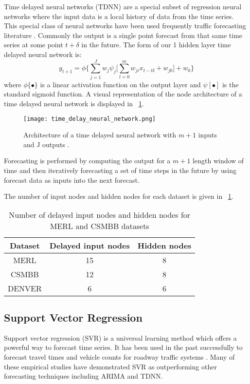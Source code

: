 Time delayed neural networks (TDNN) are a special subset of regression neural networks where the input data is a local history of data from the time series.  This special class of neural networks have been used frequently traffic forecasting literature \cite{Abdulhai1999, Ishak2003}.  Commonly the output is a single point forecast from that same time series at some point $t + \delta$ in the future.   The form of our 1 hidden layer time delayed neural network is:
\begin{equation}
y_{t + 1} = \phi \{ \sum_{j = 1}^{J} w_{j}\psi_{j} \bigg[ \sum_{l = 0}^{m}w_{ji}x_{t - l\delta} + w_{j0} \bigg] + w_0 \}
\end{equation}
\noindent where $\phi\{\bullet\}$ is a linear activation function on the output layer and $\psi[\bullet]$ is the standard sigmoid function.  A visual representation of the node architecture of a time delayed neural network is displayed in ~\ref{fig:tdnnarch}.

\begin{figure}[h]
	\centering
		\texttt{[image: time\_delay\_neural\_network.png]}
		\caption{Architecture of a time delayed neural network with $m + 1$ inputs and J outputs \cite{Hansen2003}.}
	\label{fig:tdnnarch}
\end{figure}

Forecasting is performed by computing the output for a $m + 1$ length window of time and then iteratively forecasting a set of time steps in the future by using forecast data as inputs into the next forecast. 

The number of input nodes and hidden nodes for each dataset is given in ~\ref{fig:tdnntab}.

\begin{table}[h]
\centering
\caption{Number of delayed input nodes and hidden nodes for MERL and CSMBB datasets}
\begin{tabular}{|c|c|c|} \hline
Dataset & Delayed input nodes & Hidden nodes\\ \hline
MERL & 15 & 8\\ \hline
CSMBB & 12 & 8\\ \hline
DENVER & 6 & 6\\ \hline
\end{tabular}
\label{fig:tdnntab}
\end{table}


\subsection{Support Vector Regression}
Support vector regression (SVR) is a universal learning method which offers a powerful way to forecast time series.  It has been used in the past successfully to forecast travel times and vehicle counts for roadway traffic systems \cite{Wu2004, Wei2013, Wei2012, Howard2013}.  Many of these empirical studies have demonstrated SVR as outperforming other forecasting techniques including ARIMA and TDNN.

